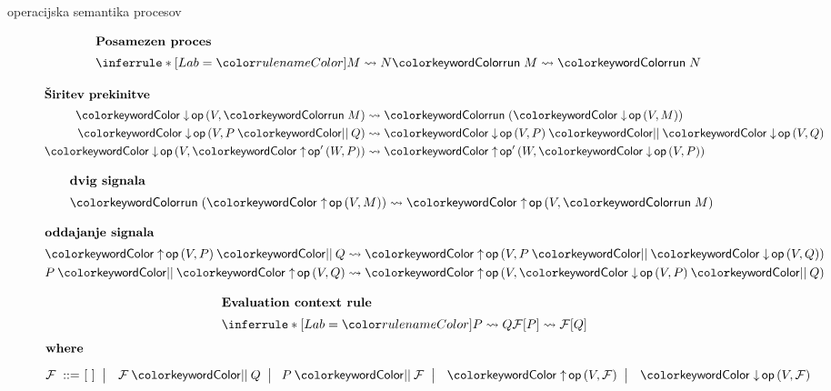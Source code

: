 \documentclass{beamer}
\theoremstyle{definition} %
\theoremstyle{plain} %
\begin{document}
	\begin{frame}{\lae{} operacijska semantika procesov}
		\begin{figure}[tp]
			\parbox{\textwidth}{
				\centering
				\tiny
				\begin{minipage}[t]{0.4\textwidth}
					\centering
					\begin{align*}
					\shortintertext{\textbf{Posamezen proces}}
					\coopinfer{}{
						M \reduces N
					}{
						\tmrun M \reduces \tmrun N
					}
					\end{align*}
				\end{minipage}
				\qquad
				\begin{minipage}[t]{0.4\textwidth}
					\centering
					\begin{align*}
					\shortintertext{\textbf{Širitev prekinitve}}
					\tmopin{op}{V}{\tmrun M} &\reduces \tmrun {(\tmopin{op}{V}{M})}
					\\
					\tmopin{op}{V}{\tmpar P Q} &\reduces \tmpar {\tmopin{op}{V}{P}} {\tmopin{op}{V}{Q}}
					\\
					\tmopin{op}{V}{\tmopout{op'}{W}{P}} &\reduces \tmopout{op'}{W}{\tmopin{op}{V}{P}}
					\end{align*}
				\end{minipage}
			
				
				
				
				\begin{minipage}[t]{0.4\textwidth}
					\centering
					\begin{align*}
					\shortintertext{\textbf{dvig signala}}
					\tmrun {(\tmopout{op}{V}{M})}  &\reduces \tmopout{op}{V}{\tmrun M}
					\end{align*}
				\end{minipage}
				\qquad
				\begin{minipage}[t]{0.4\textwidth}
					\centering
					\begin{align*}
					\shortintertext{\textbf{oddajanje signala}}
					\tmpar{\tmopout{op}{V}{P}}{Q} &\reduces \tmopout{op}{V}{\tmpar{P}{\tmopin{op}{V}{Q}}}
					\\
					\tmpar{P}{\tmopout{op}{V}{Q}} &\reduces \tmopout{op}{V}{\tmpar{\tmopin{op}{V}{P}}{Q}}
					\end{align*}
				\end{minipage}
				
		
				\begin{align*}
				\shortintertext{\quad\textbf{Evaluation context rule}}
				\quad
				\coopinfer{}{
					P \reduces Q
				}{
					\F[P] \reduces \F[Q]
				}
				\end{align*}
				\vspace{-8ex}
				\begin{align*}
				\shortintertext{\textbf{where}\vspace{1ex}}
				\text{$\F$}
				\bnfis& [~]
				\bnfor \tmpar \F Q \bnfor\! \tmpar P \F
				\bnfor \tmopout{op}{V}{\F}
				\bnfor \tmopin{op}{V}{\F}
				\end{align*}
			} 
		\end{figure}
	\end{frame}
\end{document}
